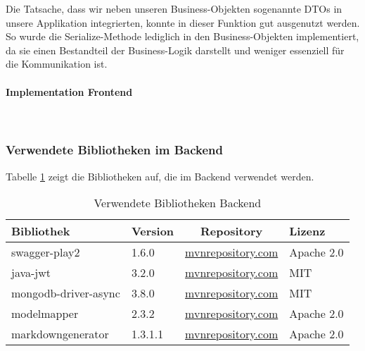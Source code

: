 Die Tatsache, dass wir neben unseren Business-Objekten sogenannte DTOs in unsere Applikation integrierten, konnte in dieser Funktion gut ausgenutzt werden. So wurde die Serialize-Methode lediglich in den Business-Objekten implementiert, da sie einen Bestandteil der Business-Logik darstellt und weniger essenziell für die Kommunikation ist.

\paragraph*{Implementation Frontend}~\\

\subsubsection{Verwendete Bibliotheken im Backend}
Tabelle \ref{tab:verwendete-libraries-play} zeigt die Bibliotheken auf, die im Backend verwendet werden. 
\begin{table}[h]
	\centering
	\begin{tabular}{| l | l | c | l |}
		\hline
		\textbf{Bibliothek} & \textbf{Version} & \textbf{Repository} & \textbf{Lizenz}\\
		\hline
		swagger-play2 & 1.6.0 & \href{https://mvnrepository.com/artifact/io.swagger/swagger-play2_2.12/1.6.0}{mvnrepository.com} & Apache 2.0 \\
		java-jwt & 3.2.0 & \href{https://mvnrepository.com/artifact/com.auth0/java-jwt/3.2.0}{mvnrepository.com} & MIT \\
		mongodb-driver-async & 3.8.0 & \href{https://mvnrepository.com/artifact/org.mongodb/mongodb-driver-async/3.8.0}{mvnrepository.com} & MIT \\
		modelmapper & 2.3.2 & \href{https://mvnrepository.com/artifact/org.modelmapper/modelmapper/2.3.2}{mvnrepository.com} & Apache 2.0 \\
		markdowngenerator & 1.3.1.1 & \href{https://mvnrepository.com/artifact/net.steppschuh.markdowngenerator/markdowngenerator}{mvnrepository.com} & Apache 2.0 \\
		\hline
	\end{tabular}
	\caption[Story-Points]{Verwendete Bibliotheken Backend}
	\label{tab:verwendete-libraries-play}
\end{table}

